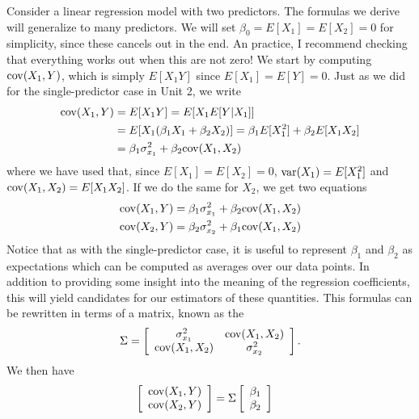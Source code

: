  Consider a linear regression model with two predictors. The formulas we derive will generalize to many predictors. We will set $\beta_0=E[X_1]=E[X_2]=0$ for simplicity, since these cancels out in the end. An practice, I recommend checking that everything works out when this are not zero! We start by computing ${\rm cov}(X_1,Y)$, which is simply $E[X_1Y]$ since $E[X_1]=E[Y] = 0$. 
Just as we did for the single-predictor case in Unit 2, we write
\begin{align*}
{\rm cov}(X_1,Y) &= E[X_1Y] = E[X_1E[Y|X_1]] \\
&= E[X_1(\beta_1 X_1 + \beta_2 X_2)] = \beta_1 E[X_1^2] + \beta_2 E[X_1X_2]\\
&= \beta_1 \sigma_{x_1}^2  + \beta_2 {\rm cov}(X_1,X_2)
\end{align*}
where we have used that, since $E[X_1]=E[X_2]=0$, ${\rm var}(X_1) = E[X_1^2]$ and ${\rm cov}(X_1,X_2) = E[X_1X_2]$.
 If we do the same for $X_2$, we get two equations
 \begin{align*}
 {\rm cov}(X_1,Y)  &= \beta_1 \sigma_{x_1}^2  + \beta_2 {\rm cov}(X_1,X_2)\\
{\rm cov}(X_2,Y) &=   \beta_2 \sigma_{x_2}^2  + \beta_1 {\rm cov}(X_1,X_2)
 \end{align*}
Notice that as with the single-predictor case, it is useful to represent $\beta_1$ and $\beta_2$ as expectations which can be computed as averages over our data points. In addition to providing some insight into the meaning of the regression coefficients, this will yield candidates for our estimators of these quantities. This formulas can be rewritten in terms of a matrix, known as the 
\begin{equation}
\Sigma =  \left[\begin{array}{cc}
\sigma_{x_1}^2 & {\rm cov}(X_1,X_2)\\
 {\rm cov}(X_1,X_2) & \sigma_{x_2}^2
 \end{array} \right].
\end{equation}
We then have 
\begin{align}\label{eq:betacov1}
\left[\begin{array}{c}
{\rm cov}(X_1,Y) \\
{\rm cov}(X_2,Y)  
\end{array}\right] &= \Sigma \left[ \begin{array}{c}
\beta_1\\
  \beta_2\\
  \end{array}\right]
\end{align}
